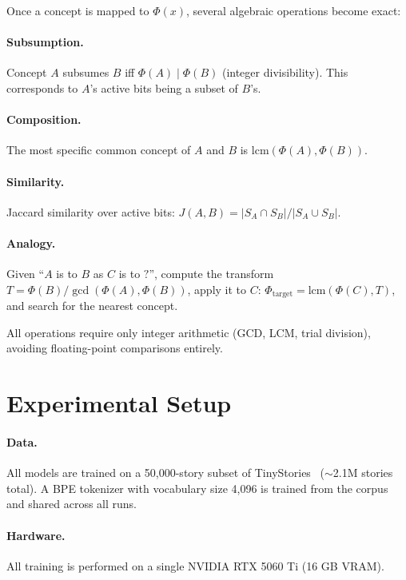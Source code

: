 \documentclass[11pt,a4paper]{article}
\begin{document}
Once a concept is mapped to $\Phi(x)$, several algebraic operations become exact:

\paragraph{Subsumption.} Concept $A$ subsumes $B$ iff $\Phi(A) \mid \Phi(B)$ (integer divisibility). This corresponds to $A$'s active bits being a subset of $B$'s.

\paragraph{Composition.} The most specific common concept of $A$ and $B$ is $\text{lcm}(\Phi(A), \Phi(B))$.

\paragraph{Similarity.} Jaccard similarity over active bits: $J(A,B) = |S_A \cap S_B| / |S_A \cup S_B|$.

\paragraph{Analogy.} Given ``$A$ is to $B$ as $C$ is to $?$'', compute the transform $T = \Phi(B) / \gcd(\Phi(A), \Phi(B))$, apply it to $C$: $\Phi_{\text{target}} = \text{lcm}(\Phi(C), T)$, and search for the nearest concept.

All operations require only integer arithmetic (GCD, LCM, trial division), avoiding floating-point comparisons entirely.


\section{Experimental Setup}
\label{sec:setup}

\paragraph{Data.} All models are trained on a 50,000-story subset of TinyStories~\citep{eldan2023tinystories} ($\sim$2.1M stories total). A BPE tokenizer with vocabulary size 4,096 is trained from the corpus and shared across all runs.

\paragraph{Hardware.} All training is performed on a single NVIDIA RTX 5060 Ti (16 GB VRAM).
\end{document}
